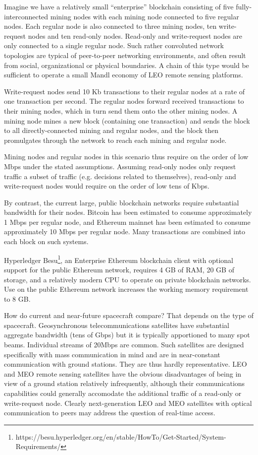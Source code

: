 \documentclass[journal ]{new-aiaa}
\begin{document}
Imagine we have a relatively small ``enterprise'' blockchain consisting of five fully-interconnected mining nodes with each mining node connected to five regular nodes. Each regular node is also connected to three mining nodes, ten write-request nodes and ten read-only nodes. Read-only and write-request nodes are only connected to a single regular node. Such rather convoluted network topologies are typical of peer-to-peer networking environments, and often result from social, organizational or physical boundaries. A chain of this type would be sufficient to operate a small Mandl economy of LEO remote sensing platforms.

Write-request nodes send 10 Kb transactions to their regular nodes at a rate of one transaction per second. The regular nodes forward received transactions to their mining nodes, which in turn send them onto the other mining nodes. A mining node mines a new block (containing one transaction) and sends the block to all directly-connected mining and regular nodes, and the block then promulgates through the network to reach each mining and regular node.

Mining nodes and regular nodes in this scenario thus require on the order of low Mbps under the stated assumptions. Assuming read-only nodes only request traffic a subset of traffic (e.g. decisions related to themselves), read-only and write-request nodes would require on the order of low tens of Kbps.

By contrast, the current large, public blockchain networks require substantial bandwidth for their nodes. Bitcoin has been estimated to consume approximately 1 Mbps per regular node, and Ethereum mainnet has been estimated to consume approximately 10 Mbps per regular node. Many transactions are combined into each block on such systems.

Hyperledger Besu\footnote{https://besu.hyperledger.org/en/stable/HowTo/Get-Started/System-Requirements/}, an Enterprise Ethereum blockchain client with optional support for the public Ethereum network, requires 4 GB of RAM, 20 GB of storage, and a relatively modern CPU to operate on private blockchain networks. Use on the public Ethereum network increases the working memory requirement to 8 GB.

How do current and near-future spacecraft compare? That depends on the type of spacecraft. Geosynchronous telecommunications satellites have substantial aggregate bandwidth (tens of Gbps) but it is typically apportioned to many spot beams. Individual streams of 20Mbps are common. Such satellites are designed specifically with mass communication in mind and are in near-constant communication with ground stations. They are thus hardly representative. LEO and MEO remote sensing satellites have the obvious disadvantages of being in view of a ground station relatively infrequently, although their communications capabilities could generally accomodate the additional traffic of a read-only or write-request node. Clearly next-generation LEO and MEO satellites with optical communication to peers may address the question of real-time access.
\end{document}
